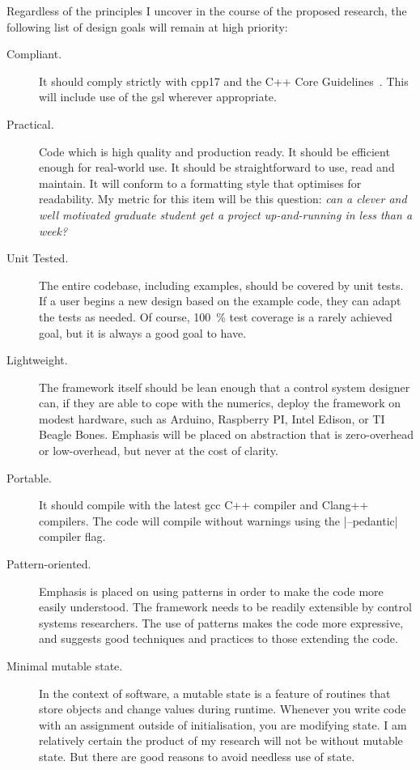 Regardless of the principles I uncover in the course of the proposed research,
the following list of design goals will remain at high priority:
%
\begin{description}
  \item[Compliant.] It should comply strictly with \acl{cpp17} and the C++ Core
  Guidelines~\cite{CppCoreGuidelines}. This will include
  use of the \ac{gsl} wherever appropriate.
  \item[Practical.] Code which is high quality and production ready. It should
  be efficient enough for real-world use. It should be straightforward to use,
  read and maintain. It will conform to a formatting style that optimises for
  readability. My metric for this item will be this question: \emph{can a clever
  and well motivated graduate student get a project up-and-running in less than
  a week?}
  \item[Unit Tested.] The entire codebase, including examples, should be covered
  by unit tests. If a user begins a new design based on the example code, they
  can adapt the tests as needed. Of course, \SI{100}{\percent} test coverage is
  a rarely achieved goal, but it is always a good goal to have.
  \item[Lightweight.] The framework itself should be lean enough that a control
  system designer can, if they are able to cope with the numerics, deploy the
  framework on modest hardware, such as Arduino, Raspberry PI, Intel Edison, or
  TI Beagle Bones. Emphasis will be placed on abstraction that is zero-overhead
  or low-overhead, but never at the cost of clarity.
  \item[Portable.] It should compile with the latest \ac{gcc} C++ compiler and
  Clang++ compilers. The code will compile without warnings using the
  |--pedantic| compiler flag.
  \item[Pattern-oriented.] Emphasis is placed on using patterns in order to make
  the code more easily understood. The framework needs to be readily extensible
  by control systems researchers. The use of patterns makes the code more
  expressive, and suggests good techniques and practices to those extending the
  code.
  \item[Minimal mutable state.] In the context of software, a mutable state is a
  feature of routines that store objects and change values during runtime.
  Whenever you write code with an assignment outside of initialisation, you are
  modifying state. I am relatively certain the product of my research will not
  be without mutable state. But there are good reasons to avoid needless use of
  state.


\end{description}
